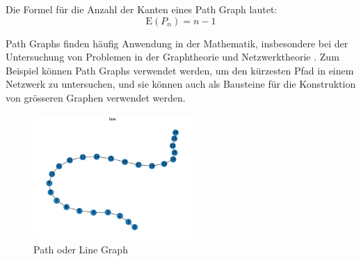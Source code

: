 Die Formel für die Anzahl der Kanten eines Path Graph lautet:
\begin{equation}
    \text{E}(P_n) = n-1
\end{equation}

Path Graphs finden häufig Anwendung in der Mathematik, insbesondere bei der Untersuchung von Problemen in der Graphtheorie und Netzwerktheorie \cite{bender_lists_2010}. 
Zum Beispiel können Path Graphs verwendet werden, um den kürzesten Pfad in einem Netzwerk zu untersuchen, und sie können auch als Bausteine für die Konstruktion von grösseren Graphen verwendet werden.

\begin{figure}[H]
    \centering
    \includegraphics[width=6cm]{images/20_material_methods/path.png}
    \caption{Path oder Line Graph}
    \label{fig:path-graph}
\end{figure}
